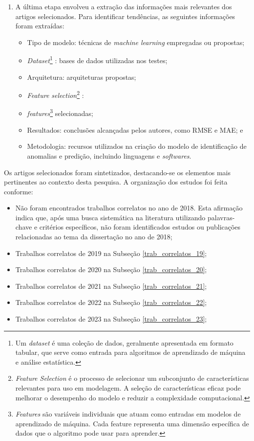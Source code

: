\begin{enumerate}
\item A última etapa envolveu a extração das informações mais relevantes dos artigos selecionados. Para identificar tendências, as seguintes informações foram extraídas:
     \begin{itemize}
         \item Tipo de modelo: técnicas de \textit{machine learning} empregadas ou propostas;
         \item \textit{Dataset}\footnote{Um \textit{dataset} é uma coleção de dados, geralmente apresentada em formato tabular, que serve como entrada para algoritmos de aprendizado de máquina e análise estatística.} : bases de dados utilizadas nos testes;
         \item Arquitetura: arquiteturas propostas;
         \item \textit{Feature selection}\footnote{\textit{Feature Selection} é o processo de selecionar um subconjunto de características relevantes para uso em modelagem. A seleção de características eficaz pode melhorar o desempenho do modelo e reduzir a complexidade computacional.} :
         \item  \textit{features}\footnote{\textit{Features} são variáveis individuais que atuam como entradas em modelos de aprendizado de máquina. Cada feature representa uma dimensão específica de dados que o algoritmo pode usar para aprender.} selecionadas;
         \item Resultados: conclusões alcançadas pelos autores, como RMSE e MAE; e
         \item Metodologia: recursos utilizados na criação do modelo de identificação de anomalias e predição, incluindo linguagens e \textit{softwares}.
     \end{itemize}

\end{enumerate}

Os artigos selecionados foram sintetizados, destacando-se os elementos mais pertinentes ao contexto desta pesquisa. A organização dos estudos foi feita conforme:

\begin{itemize}
    \item Não foram encontrados trabalhos correlatos no ano de 2018. Esta afirmação indica que, após uma busca sistemática na literatura utilizando palavras-chave e critérios específicos, não foram identificados estudos ou publicações relacionadas ao tema da dissertação no ano de 2018;
    \item Trabalhos correlatos de 2019 na Subseção \ref{trab_correlatos_19};
    \item Trabalhos correlatos de 2020 na Subseção \ref{trab_correlatos_20};
    \item Trabalhos correlatos de 2021 na Subseção \ref{trab_correlatos_21};
    \item Trabalhos correlatos de 2022 na Subseção \ref{trab_correlatos_22};
    \item Trabalhos correlatos de 2023 na Subseção \ref{trab_correlatos_23};
\end{itemize}

